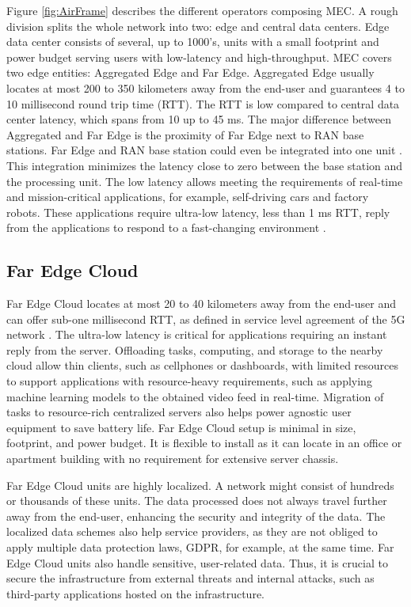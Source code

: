 Figure \ref{fig:AirFrame} describes the different operators composing MEC. A rough division splits the whole network into two: edge and central data centers. Edge data center consists of several, up to 1000's, units with a small footprint and power budget serving users with low-latency and high-throughput. MEC covers two edge entities: Aggregated Edge and Far Edge. Aggregated Edge usually locates at most 200 to 350 kilometers away from the end-user and guarantees 4 to 10 millisecond round trip time (RTT). The RTT is low compared to central data center latency, which spans from 10 up to 45 ms. The major difference between Aggregated and Far Edge is the proximity of Far Edge next to RAN base stations. Far Edge and RAN base station could even be integrated into one unit \cite{AirFrameOpenEdgeServer}. This integration minimizes the latency close to zero between the base station and the processing unit. The low latency allows meeting the requirements of real-time and mission-critical applications, for example, self-driving cars and factory robots. These applications require ultra-low latency, less than 1 ms RTT, reply from the applications to respond to a fast-changing environment \cite{Ning2019}.

\subsection{Far Edge Cloud}

Far Edge Cloud locates at most 20 to 40 kilometers away from the end-user and can offer sub-one millisecond RTT, as defined in service level agreement of the 5G network \cite{Parvez2018}. The ultra-low latency is critical for applications requiring an instant reply from the server. Offloading tasks, computing, and storage to the nearby cloud allow thin clients, such as cellphones or dashboards, with limited resources to support applications with resource-heavy requirements, such as applying machine learning models to the obtained video feed in real-time. Migration of tasks to resource-rich centralized servers also helps power agnostic user equipment to save battery life. Far Edge Cloud setup is minimal in size, footprint, and power budget. It is flexible to install as it can locate in an office or apartment building with no requirement for extensive server chassis. \cite{AirFrameOpenEdgeServer}

Far Edge Cloud units are highly localized. A network might consist of hundreds or thousands of these units. The data processed does not always travel further away from the end-user, enhancing the security and integrity of the data. The localized data schemes also help service providers, as they are not obliged to apply multiple data protection laws, GDPR, for example, at the same time. Far Edge Cloud units also handle sensitive, user-related data. Thus, it is crucial to secure the infrastructure from external threats and internal attacks, such as third-party applications hosted on the infrastructure.

